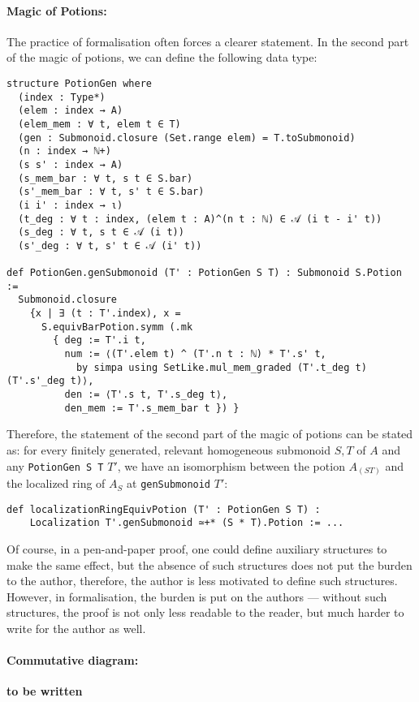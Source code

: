 \documentclass[graybox]{svmult}
\begin{document}
\paragraph{Magic of Potions:}%
The practice of formalisation often forces a clearer statement.
In the second part of the magic of potions, we can define the following data type:
\begin{lstlisting}
structure PotionGen where
  (index : Type*)
  (elem : index → A)
  (elem_mem : ∀ t, elem t ∈ T)
  (gen : Submonoid.closure (Set.range elem) = T.toSubmonoid)
  (n : index → ℕ+)
  (s s' : index → A)
  (s_mem_bar : ∀ t, s t ∈ S.bar)
  (s'_mem_bar : ∀ t, s' t ∈ S.bar)
  (i i' : index → ι)
  (t_deg : ∀ t : index, (elem t : A)^(n t : ℕ) ∈ 𝒜 (i t - i' t))
  (s_deg : ∀ t, s t ∈ 𝒜 (i t))
  (s'_deg : ∀ t, s' t ∈ 𝒜 (i' t))

def PotionGen.genSubmonoid (T' : PotionGen S T) : Submonoid S.Potion :=
  Submonoid.closure
    {x | ∃ (t : T'.index), x =
      S.equivBarPotion.symm (.mk
        { deg := T'.i t,
          num := ⟨(T'.elem t) ^ (T'.n t : ℕ) * T'.s' t,
            by simpa using SetLike.mul_mem_graded (T'.t_deg t) (T'.s'_deg t)⟩,
          den := ⟨T'.s t, T'.s_deg t⟩,
          den_mem := T'.s_mem_bar t }) }
\end{lstlisting}
Therefore, the statement of the second part of the magic of potions can be stated as:
for every finitely generated, relevant homogeneous submonoid $S, T$ of $A$ and any \lstinline|PotionGen S T| $T'$, we have an isomorphism between
the potion $A_{(ST)}$ and the localized ring of $A_S$ at \lstinline|genSubmonoid| $T'$:
\begin{lstlisting}
def localizationRingEquivPotion (T' : PotionGen S T) :
    Localization T'.genSubmonoid ≃+* (S * T).Potion := ...
\end{lstlisting}
Of course, in a pen-and-paper proof, one could define auxiliary structures to make the same effect, 
but the absence of such structures does not put the burden to the author, therefore, the author is 
less motivated to define such structures. However, in formalisation, 
the burden is put on the authors --- without such structures, the proof is not only less readable to the reader, but much harder to write for the author as well.

\paragraph{Commutative diagram:}%
{\bf to be written}
\end{document}
